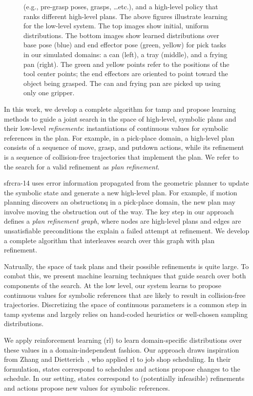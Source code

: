 \begin{figure}[t]
{{      (e.g., pre-grasp poses, grasps, \ldots etc.), and a high-level
      policy that ranks different high-level plans. The above figures
      illustrate learning for the low-level system. The top images
      show initial, uniform distributions. The bottom images show
      learned distributions over base pose (blue) and end effector
      pose (green, yellow) for pick tasks in our simulated domains: a
      can (left), a tray (middle), and a frying pan (right).  The
      green and yellow points refer to the positions of the tool
      center points; the end effectors are oriented to point toward
      the object being grasped. The can and frying pan are picked up
      using only one gripper.}}
  \label{fig:cover}
\end{figure}

In this work, we develop a complete algorithm for {\sc tamp} and
propose learning methods to guide a joint search in the space of
high-level, symbolic plans and their low-level \emph{refinements}:
instantiations of continuous values for symbolic references in the
plan. For example, in a pick-place domain, a high-level plan consists
of a sequence of move, grasp, and putdown actions, while its
refinement is a sequence of collision-free trajectories that implement
the plan. We refer to the search for a valid refinement as \emph{plan
  refinement}.

{\sc sfrcra-14} uses error information propagated from the geometric
planner to update the symbolic state and generate a new high-level
plan.  For example, if motion planning discovers an obstructionq in a
pick-place domain, the new plan may involve moving the obstruction out
of the way.  The key step in our approach defines a \emph{plan
  refinement graph}, where nodes are high-level plans and edges are
unsatisfiable preconditions the explain a failed attempt at
refinement. We develop a complete algorithm that interleaves search
over this graph with plan refinement.

Natrually, the space of task plans and their possible refinements is
quite large. To combat this, we present machine learning techniques
that guide search over both components of the search. At the low
level, our system learns to propose continuous values for symbolic
references that are likely to result in collision-free
trajectories. Discretizing the space of continuous parameters is a
common step in {\sc tamp} systems and largely relies on hand-coded
heuristics or well-chosen sampling distributions. 

We apply reinforcement learning ({\sc rl}) to learn domain-specific
distributions over these values in a domain-independent fashion.  Our
approach draws inspiration from Zhang and
Dietterich~\cite{JobShopSched}, who applied {\sc rl} to job shop
scheduling. In their formulation, states correspond to schedules and
actions propose changes to the schedule. In our setting, states
correspond to (potentially infeasible) refinements and actions propose
new values for symbolic references.


